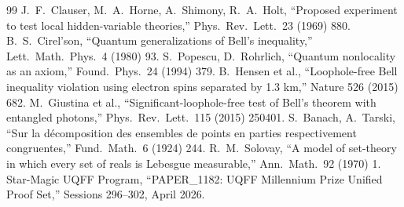 \documentclass[11pt]{article}
\begin{document}
\begin{thebibliography}{99}
 J.~F.~Clauser, M.~A.~Horne, A.\ Shimony, R.~A.~Holt, ``Proposed experiment to test local hidden-variable theories,'' Phys.\ Rev.\ Lett.\ 23 (1969) 880.
 B.~S.~Cirel'son, ``Quantum generalizations of Bell's inequality,'' Lett.\ Math.\ Phys.\ 4 (1980) 93.
 S.\ Popescu, D.\ Rohrlich, ``Quantum nonlocality as an axiom,'' Found.\ Phys.\ 24 (1994) 379.
 B.\ Hensen et al., ``Loophole-free Bell inequality violation using electron spins separated by 1.3 km,'' Nature 526 (2015) 682.
 M.\ Giustina et al., ``Significant-loophole-free test of Bell's theorem with entangled photons,'' Phys.\ Rev.\ Lett.\ 115 (2015) 250401.
 S.\ Banach, A.\ Tarski, ``Sur la d\'ecomposition des ensembles de points en parties respectivement congruentes,'' Fund.\ Math.\ 6 (1924) 244.
 R.~M.~Solovay, ``A model of set-theory in which every set of reals is Lebesgue measurable,'' Ann.\ Math.\ 92 (1970) 1.
 Star-Magic UQFF Program, ``PAPER\_1182: UQFF Millennium Prize Unified Proof Set,'' Sessions 296--302, April 2026.
\end{thebibliography}
\end{document}
